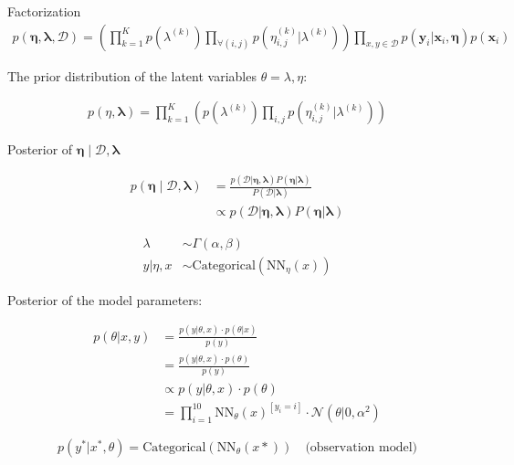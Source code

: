 Factorization
\begin{align*}
    p(\bm \eta, \bm \lambda, \mathcal D) = \left(\prod_{k=1}^K  p(\lambda^{(k)}) \prod_{\forall (i,j)} p(\eta_{i,j}^{(k)}|\lambda^{(k)})  \right) 
    \prod_{x, y\in \mathcal D} p(\bm y_i | \bm x_i, \bm \eta) p(\bm x_i)
\end{align*}

The prior distribution of the latent variables $\theta = \lambda, \eta$: 

\begin{align*}
    p(\eta, \bm \lambda) =  \prod_{k=1}^K \left( p(\lambda^{(k)}) \prod_{i,j} p(\eta_{i,j}^{(k)}|\lambda^{(k)})\right)
\end{align*}


Posterior of $\bm \eta \mid \mathcal D, \bm \lambda$

\begin{align*}
    p(\bm \eta \mid \mathcal D,\bm \lambda) &=
    \frac
    {p(\mathcal D|\bm \eta,\bm \lambda)P(\bm \eta | \bm \lambda)}
    {P(\mathcal D|\bm \lambda)} \\
    &\propto p(\mathcal D|\bm \eta,\bm \lambda)P(\bm \eta | \bm \lambda)
\end{align*}


\begin{align*}
    \lambda &\sim \Gamma (\alpha, \beta)\\
    y | \eta, x &\sim \text{Categorical}(\text{NN}_\eta(x))
\end{align*}

Posterior of the model parameters:
    
\begin{align*}
    p(\theta | x, y) &= \frac{p(y |\theta, x) \cdot p(\theta|x)}{p(y) } \\
                     &= \frac{p(y |\theta, x) \cdot p(\theta)}{p(y) } \\
                     &\propto p(y |\theta, x) \cdot p(\theta) \\
                     &=\prod_{i=1}^{10}\text{NN}_\theta(x)^{[ y_i = i]} \cdot \mathcal{N}(\theta | 0, \alpha^2)
\end{align*}

$$
p(y^\ast | x^\ast, \theta ) = \text{Categorical}(\text{NN}_\theta(x\ast)) \quad \text{(observation model)}
$$
